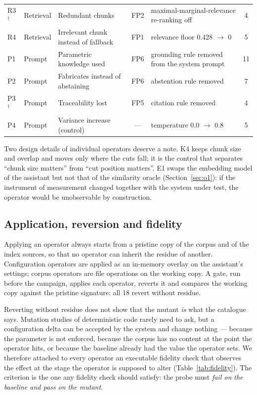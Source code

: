 \documentclass[a4paper,fleqn]{cas-dc}
\begin{document}
\begin{table}[width=\textwidth,cols=6,pos=t]
\begin{tabular*}{\tblwidth}{@{} LLLCLC @{}}
R3$^\dagger$ & Retrieval & Redundant chunks                & FP2 & maximal-marginal-relevance re-ranking off & 4 \\
R4 & Retrieval & Irrelevant chunk instead of fallback      & FP1 & relevance floor 0.428 $\rightarrow$ 0 & 5 \\
\midrule
P1 & Prompt    & Parametric knowledge used                 & FP6 & grounding rule removed from the system prompt & 11 \\
P2 & Prompt    & Fabricates instead of abstaining          & FP6 & abstention rule removed & 7 \\
P3$^\dagger$ & Prompt & Traceability lost                  & FP5 & citation rule removed & 4 \\
P4 & Prompt    & Variance increase (control)               & --- & temperature 0.0 $\rightarrow$ 0.8 & 5 \\
\bottomrule
\end{tabular*}
\end{table}

Two design details of individual operators deserve a note. K4 keeps chunk size
and overlap and moves only where the cuts fall; it is the control that
separates ``chunk size matters'' from ``cut position matters''. E1 swaps the
embedding model of the assistant but not that of the similarity oracle
(Section~\ref{sec:o1}): if the instrument of measurement changed together with
the system under test, the operator would be unobservable by construction.

\subsection{Application, reversion and fidelity}
\label{sec:fidelity}

Applying an operator always starts from a pristine copy of the corpus and of
the index sources, so that no operator can inherit the residue of another.
Configuration operators are applied as an in-memory overlay on the assistant's
settings; corpus operators are file operations on the working copy. A gate,
run before the campaign, applies each operator, reverts it and compares the
working copy against the pristine signature: all 18 revert without residue.

Reverting without residue does not show that the mutant \emph{is} what the
catalogue says. Mutation studies of deterministic code rarely need to ask, but
a configuration delta can be accepted by the system and change nothing ---
because the parameter is not enforced, because the corpus has no content at
the point the operator hits, or because the baseline already had the value the
operator sets. We therefore attached to every operator an executable fidelity
check that observes the effect at the stage the operator is supposed to alter
(Table~\ref{tab:fidelity}). The criterion is the one any fidelity check should
satisfy: the probe must \emph{fail on the baseline and pass on the mutant}.
\end{document}
